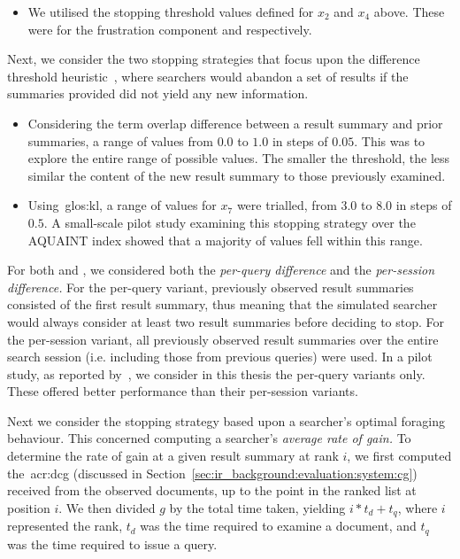 \begin{itemize}
    \item{ We utilised the stopping threshold values defined for $x_2$ and $x_4$ above. These were for the frustration component  and  respectively.}
\end{itemize}

Next, we consider the two stopping strategies that focus upon the difference threshold heuristic~\citep{nickles1995judgment}, where searchers would abandon a set of results if the summaries provided did not yield any new information.

\begin{itemize}
    \item{ Considering the term overlap difference between a result summary and prior summaries, a range of values from $0.0$ to $1.0$ in steps of $0.05$. This was to explore the entire range of possible values. The smaller the threshold, the less similar the content of the new result summary to those previously examined.}
    
    \item{ Using~\gls{glos:kl}, a range of values for $x_7$ were trialled, from $3.0$ to $8.0$ in steps of $0.5$. A small-scale pilot study examining this stopping strategy over the AQUAINT index showed that a majority of values fell within this range.}
\end{itemize}

For both  and , we considered both the \emph{per-query difference} and the \emph{per-session difference.} For the per-query variant, previously observed result summaries consisted of the first result summary, thus meaning that the simulated searcher would always consider at least two result summaries before deciding to stop. For the per-session variant, all previously observed result summaries over the entire search session (i.e. including those from previous queries) were used. In a pilot study, as reported by~\cite{maxwell2015initial_stopping}, we consider in this thesis the per-query variants only. These offered better performance than their per-session variants.

Next we consider the stopping strategy based upon a searcher's optimal foraging behaviour. This concerned computing a searcher's \emph{average rate of gain.} To determine the rate of gain at a given result summary at rank $i$, we first computed the~\gls{acr:dcg} (discussed in Section~\ref{sec:ir_background:evaluation:system:cg}) received from the observed documents, up to the point in the ranked list at position $i$. We then divided $g$ by the total time taken, yielding $i * t_d + t_q$, where $i$ represented the rank, $t_d$ was the time required to examine a document, and $t_q$ was the time required to issue a query.

